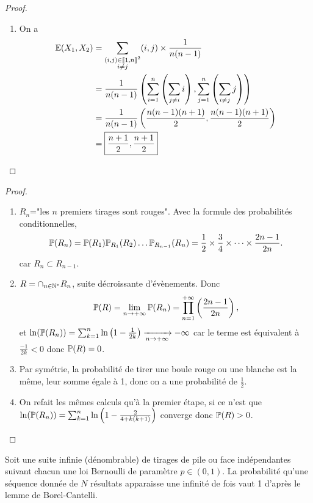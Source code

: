 \documentclass[12pt]{article}
\begin{document}
\begin{proof}
\begin{enumerate}
        \item On a 
        \begin{align}
            \E(X_{1},X_{2})
            &=\sum_{\substack{(i,j)\in\llbracket1,n\rrbracket^{2}\\ i\neq j}}(i,j)\times\frac{1}{n(n-1)}\\
            &=\frac{1}{n(n-1)}\left(\sum_{i=1}^{n}\left(\sum_{j\neq i}i\right),\sum_{j=1}^{n}\left(\sum_{i\neq j}j\right)\right)\\
            &=\frac{1}{n(n-1)}\left(\frac{n(n-1)(n+1)}{2},\frac{n(n-1)(n+1)}{2}\right)\\
            &=\boxed{\frac{n+1}{2},\frac{n+1}{2}}
        \end{align}
    \end{enumerate}
\end{proof}

\begin{proof}
    \phantom{}
    \begin{enumerate}
        \item $R_n$="les $n$ premiers tirages sont rouges". Avec la formule des probabilités conditionnelles,
        \begin{equation*}
            \P(R_n)=\P(R_1)\P_{R_1}(R_2)\dots\P_{R_{n-1}}(R_n)=\frac{1}{2}\times\frac{3}{4}\times\dots\times\frac{2n-1}{2n}.
        \end{equation*}
        car $R_n\subset R_{n-1}$.
        \item $R=\cap_{n\in\N^{*}}R_n$, suite décroissante d'évènements. Donc 
        \begin{equation*}
            \P(R)=\lim\limits_{n\to+\infty}\P(R_n)=\prod_{n=1}^{+\infty}\left(\frac{2n-1}{2n}\right),
        \end{equation*}
        et $\ln(\P(R_n))=\sum_{k=1}^{n}\ln\left(1-\frac{1}{2k}\right)\xrightarrow[n\to+\infty]{}-\infty$ car le terme est équivalent à $\frac{-1}{2k}<0$ donc $\P(R)=0$.

        \item Par symétrie, la probabilité de tirer une boule rouge ou une blanche est la même, leur somme égale à 1, donc on a une probabilité de $\frac{1}{2}$.
        \item On refait les mêmes calculs qu'à la premier étape, si ce n'est que $\ln(\P(R_n))=\sum_{k=1}^{n}\ln\left(1-\frac{2}{4+k(k+1)}\right)$ converge donc $\P(R)>0$.
    \end{enumerate}
\end{proof}

\begin{remark}
    Soit une suite infinie (dénombrable) de tirages de pile ou face indépendantes suivant chacun une loi Bernoulli de paramètre $p\in(0,1)$. La probabilité qu'une séquence donnée de $N$ résultats apparaisse une infinité de fois vaut 1 d'après le lemme de Borel-Cantelli.
\end{remark}
\end{document}
